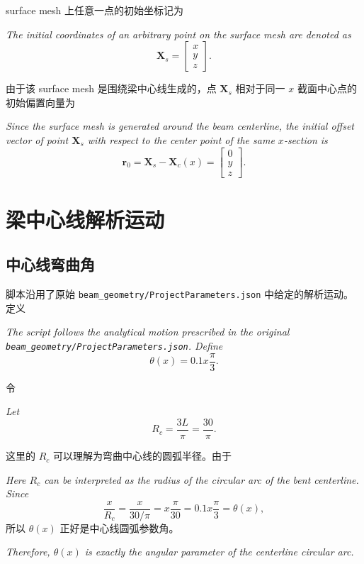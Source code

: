 \documentclass[UTF8,a4paper,11pt]{ctexart}
\begin{document}
surface mesh 上任意一点的初始坐标记为
\par\noindent\emph{The initial coordinates of an arbitrary point on the surface mesh are denoted as}
\begin{equation}
  \bm{X}_s =
  \begin{bmatrix}
    x \\ y \\ z
  \end{bmatrix}.
\end{equation}

由于该 surface mesh 是围绕梁中心线生成的，点 \(\bm{X}_s\) 相对于同一 \(x\) 截面中心点的初始偏置向量为
\par\noindent\emph{Since the surface mesh is generated around the beam centerline, the initial offset vector of point \(\bm{X}_s\) with respect to the center point of the same \(x\)-section is}
\begin{equation}
  \bm{r}_0 =
  \bm{X}_s - \bm{X}_c(x)
  =
  \begin{bmatrix}
    0 \\ y \\ z
  \end{bmatrix}.
\end{equation}

\section{梁中心线解析运动}

\subsection{中心线弯曲角}

脚本沿用了原始 \texttt{beam\_geometry/ProjectParameters.json} 中给定的解析运动。定义
\par\noindent\emph{The script follows the analytical motion prescribed in the original \texttt{beam\_geometry/ProjectParameters.json}. Define}
\begin{equation}
  \theta(x) = 0.1 x \frac{\pi}{3}.
\end{equation}

令
\par\noindent\emph{Let}
\begin{equation}
  R_c = \frac{3L}{\pi} = \frac{30}{\pi}.
\end{equation}

这里的 \(R_c\) 可以理解为弯曲中心线的圆弧半径。由于
\par\noindent\emph{Here \(R_c\) can be interpreted as the radius of the circular arc of the bent centerline. Since}
\begin{equation}
  \frac{x}{R_c}
  =
  \frac{x}{30/\pi}
  =
  x\frac{\pi}{30}
  =
  0.1x\frac{\pi}{3}
  =
  \theta(x),
\end{equation}
所以 \(\theta(x)\) 正好是中心线圆弧参数角。
\par\noindent\emph{Therefore, \(\theta(x)\) is exactly the angular parameter of the centerline circular arc.}
\end{document}
